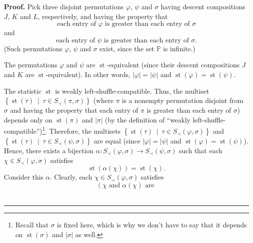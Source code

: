 \documentclass[numbers=enddot,12pt,final,onecolumn,notitlepage]{scrartcl}%
\theoremstyle{definition}
\newenvironment{proof}[1][Proof]{\noindent\textbf{#1.} }{\ \rule{0.5em}{0.5em}}
\begin{document}
\begin{proof}
Pick three disjoint permutations $\varphi$, $\psi$ and $\sigma$ having descent
compositions $J$, $K$ and $L$, respectively, and having the property that%
\[
\text{each entry of }\varphi\text{ is greater than each entry of }\sigma
\]
and%
\[
\text{each entry of }\psi\text{ is greater than each entry of }\sigma\text{.}%
\]
(Such permutations $\varphi$, $\psi$ and $\sigma$ exist, since the set
$\mathbb{P}$ is infinite.)

The permutations $\varphi$ and $\psi$ are $\operatorname*{st}$-equivalent
(since their descent compositions $J$ and $K$ are $\operatorname*{st}%
$-equivalent). In other words, $\left\vert \varphi\right\vert =\left\vert
\psi\right\vert $ and $\operatorname*{st}\left(  \varphi\right)
=\operatorname*{st}\left(  \psi\right)  $.

The statistic $\operatorname*{st}$ is weakly left-shuffle-compatible. Thus,
the multiset $\left\{  \operatorname*{st}\left(  \tau\right)  \ \mid\ \tau\in
S_{\prec}\left(  \pi,\sigma\right)  \right\}  $ (where $\pi$ is a nonempty
permutation disjoint from $\sigma$ and having the property that each entry of
$\pi$ is greater than each entry of $\sigma$) depends only on
$\operatorname*{st}\left(  \pi\right)  $ and $\left\vert \pi\right\vert $ (by
the definition of \textquotedblleft weakly
left-shuffle-compatible\textquotedblright)\footnote{Recall that $\sigma$ is
fixed here, which is why we don't have to say that it depends on
$\operatorname*{st}\left(  \sigma\right)  $ and $\left\vert \sigma\right\vert
$ as well.}. Therefore, the multisets $\left\{  \operatorname*{st}\left(
\tau\right)  \ \mid\ \tau\in S_{\prec}\left(  \varphi,\sigma\right)  \right\}
$ and $\left\{  \operatorname*{st}\left(  \tau\right)  \ \mid\ \tau\in
S_{\prec}\left(  \psi,\sigma\right)  \right\}  $ are equal (since $\left\vert
\varphi\right\vert =\left\vert \psi\right\vert $ and $\operatorname*{st}%
\left(  \varphi\right)  =\operatorname*{st}\left(  \psi\right)  $). Hence,
there exists a bijection $\alpha:S_{\prec}\left(  \varphi,\sigma\right)
\rightarrow S_{\prec}\left(  \psi,\sigma\right)  $ such that each $\chi\in
S_{\prec}\left(  \varphi,\sigma\right)  $ satisfies%
\begin{equation}
\operatorname*{st}\left(  \alpha\left(  \chi\right)  \right)
=\operatorname*{st}\left(  \chi\right)  .\label{pf.thm.dendri.K.ideal.alpha}%
\end{equation}
Consider this $\alpha$. Clearly, each $\chi\in S_{\prec}\left(  \varphi
,\sigma\right)  $ satisfies%
\[
\left(  \chi\text{ and }\alpha\left(  \chi\right)  \text{ are }%
\]
\end{proof}
\end{document}
